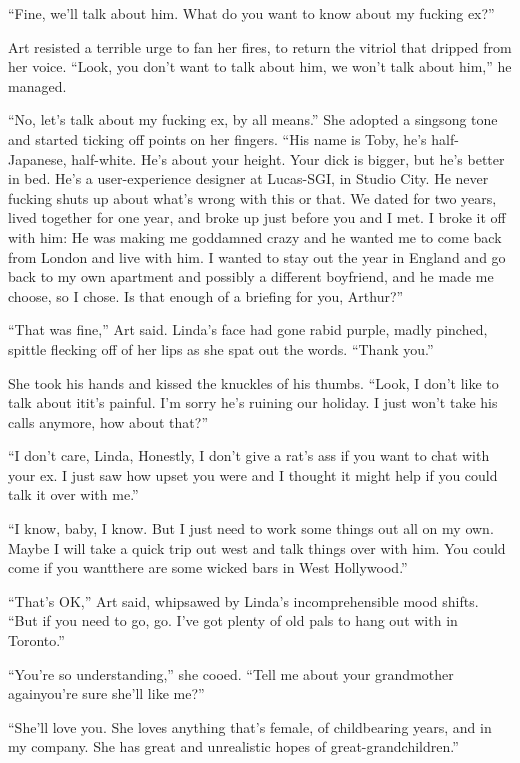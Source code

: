 “Fine, we’ll talk about him. What do you want to know about my
fucking ex?”

Art resisted a terrible urge to fan her fires, to return the
vitriol that dripped from her voice. “Look, you don’t want to talk
about him, we won’t talk about him,” he managed.

“No, let’s talk about my fucking ex, by all means.” She adopted a
singsong tone and started ticking off points on her fingers. “His
name is Toby, he’s half-Japanese, half-white. He’s about your
height. Your dick is bigger, but he’s better in bed. He’s a
user-experience designer at Lucas-SGI, in Studio City. He never
fucking shuts up about what’s wrong with this or that. We dated for
two years, lived together for one year, and broke up just before
you and I met. I broke it off with him: He was making me goddamned
crazy and he wanted me to come back from London and live with him.
I wanted to stay out the year in England and go back to my own
apartment and possibly a different boyfriend, and he made me
choose, so I chose. Is that enough of a briefing for you, Arthur?”

“That was fine,” Art said. Linda’s face had gone rabid purple,
madly pinched, spittle flecking off of her lips as she spat out the
words. “Thank you.”

She took his hands and kissed the knuckles of his thumbs. “Look, I
don’t like to talk about it{\dash}it’s painful. I’m sorry he’s ruining
our holiday. I just won’t take his calls anymore, how about that?”

“I don’t care, Linda, Honestly, I don’t give a rat’s ass if you
want to chat with your ex. I just saw how upset you were and I
thought it might help if you could talk it over with me.”

“I know, baby, I know. But I just need to work some things out all
on my own. Maybe I will take a quick trip out west and talk things
over with him. You could come if you want{\dash}there are some wicked
bars in West Hollywood.”

“That’s OK,” Art said, whipsawed by Linda’s incomprehensible mood
shifts. “But if you need to go, go. I’ve got plenty of old pals to
hang out with in Toronto.”

“You’re so understanding,” she cooed. “Tell me about your
grandmother again{\dash}you’re sure she’ll like me?”

“She’ll love you. She loves anything that’s female, of childbearing
years, and in my company. She has great and unrealistic hopes of
great-grandchildren.”

